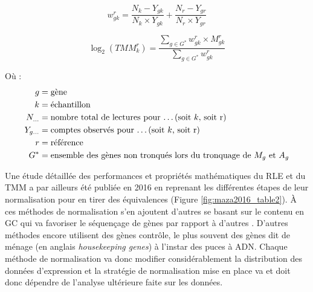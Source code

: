 \begin{equation}\label{weightedmean}
    w^r_{gk} = \frac{N_k - Y_{gk}}{N_k \times Y_{gk}} + \frac{N_r - Y_{gr}}{N_r \times Y_{gr}}
\end{equation}

\begin{equation}\label{normtmmfactor}
    \log_2{} (TMM^r_k) = \frac{\sum_{g \in G^*} w^r_{gk} \times M^r_{gk}}{\sum_{g \in G^*} w^r_{gk}}
\end{equation}

Où :
\begin{align*}
    g & = \text{gène} \\
    k & = \text{échantillon} \\
    N_{\dots} & = \text{nombre total de lectures pour \dots (soit }k \text{, soit r)} \\
    Y_{g\dots} & = \text{comptes observés pour \dots (soit }k \text{, soit r)} \\
    r & = \text{référence} \\
    G^* & = \text{ensemble des gènes non tronqués lors du tronquage de } M_g \text{ et } A_g
\end{align*}


Une étude détaillée des performances et propriétés mathématiques du RLE et du TMM a par ailleurs été publiée en 2016 en reprenant les différentes étapes de leur normalisation pour en tirer des équivalences \cite{Maza2016} (Figure \ref{fig:maza2016_table2}). À ces méthodes de normalisation s'en ajoutent d'autres se basant sur le contenu en GC qui va favoriser le séquençage de gènes par rapport à d'autres \cite{Filloux2014Dec}. D'autres méthodes encore utilisent des gènes contrôle, le plus souvent des gènes dit de ménage (en anglais \textit{housekeeping genes}) \cite{Zhou2017Sep} à l'instar des puces à ADN. Chaque méthode de normalisation va donc modifier considérablement la distribution des données d'expression et la stratégie de normalisation mise en place va et doit donc dépendre de l'analyse ultérieure faite sur les données. 


